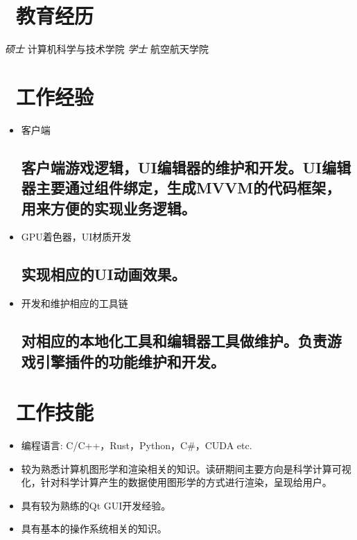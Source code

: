 \documentclass{resume}
\begin{document}



\section{\faGraduationCap\ 教育经历}
\textit{硕士} 计算机科学与技术学院
\textit{学士} 航空航天学院

\section{\faUsers\ 工作经验}
\begin{itemize}
  \item 客户端
  \subsection{客户端游戏逻辑，UI编辑器的维护和开发。UI编辑器主要通过组件绑定，生成MVVM的代码框架，用来方便的实现业务逻辑。}

  \item GPU着色器，UI材质开发
  \subsection{实现相应的UI动画效果。}

  \item 开发和维护相应的工具链
  \subsection{对相应的本地化工具和编辑器工具做维护。负责游戏引擎插件的功能维护和开发。}

\end{itemize}

\section{\faCogs\ 工作技能}
\begin{itemize}[parsep=0.5ex]
  \item 编程语言: C/C++，Rust，Python，C\#，CUDA etc.
  \item 较为熟悉计算机图形学和渲染相关的知识。读研期间主要方向是科学计算可视化，针对科学计算产生的数据使用图形学的方式进行渲染，呈现给用户。
  \item 具有较为熟练的Qt GUI开发经验。
  \item 具有基本的操作系统相关的知识。
\end{itemize}
\end{document}
